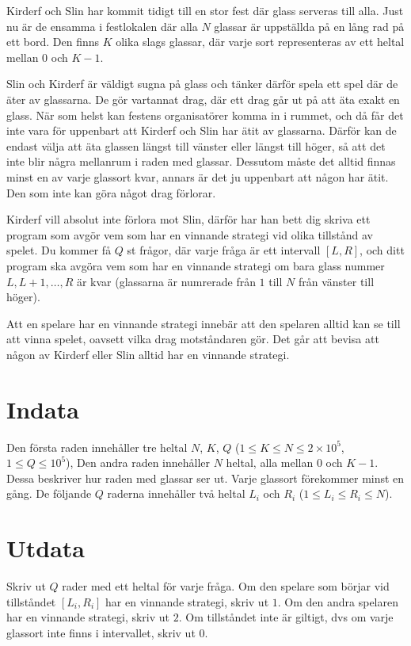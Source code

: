 Kirderf och Slin har kommit tidigt till en stor fest där glass serveras till alla.
Just nu är de ensamma i festlokalen där alla $N$ glassar är uppställda på en lång rad på ett bord.
Den finns $K$ olika slags glassar, där varje sort representeras av ett heltal mellan $0$ och $K-1$.

Slin och Kirderf är väldigt sugna på glass och tänker därför spela ett spel där de äter av glassarna.
De gör vartannat drag, där ett drag går ut på att äta exakt en glass.
När som helst kan festens organisatörer komma in i rummet, och då får det inte vara för
uppenbart att Kirderf och Slin har ätit av glassarna. Därför kan de endast välja att
äta glassen längst till vänster eller längst till höger, så att det inte blir några mellanrum
i raden med glassar. Dessutom måste det alltid finnas minst en av varje glassort kvar,
annars är det ju uppenbart att någon har ätit. Den som inte kan göra något drag förlorar.

Kirderf vill absolut inte förlora mot Slin, därför har han bett dig skriva ett program som avgör vem som har en vinnande
strategi vid olika tillstånd av spelet. Du kommer få $Q$ st frågor, där varje fråga är ett intervall $[L,R]$, och 
ditt program ska avgöra vem som har en vinnande strategi om bara glass nummer $L, L+1, \dots, R$ är kvar (glassarna
är numrerade från $1$ till $N$ från vänster till höger).

Att en spelare har en vinnande strategi innebär att den spelaren alltid kan se till att vinna spelet,
oavsett vilka drag motståndaren gör. Det går att bevisa att någon av Kirderf eller Slin alltid har en vinnande strategi.

\section*{Indata}
Den första raden innehåller tre heltal $N$, $K$, $Q$ ($1 \le K \le N \le 2 \times 10^5$, $1 \le Q \le 10^5$),
Den andra raden innehåller $N$ heltal, alla mellan $0$ och $K-1$.
Dessa beskriver hur raden med glassar ser ut. Varje glassort förekommer minst en gång.
De följande $Q$ raderna innehåller två heltal $L_i$ och $R_i$ ($1 \le L_i \le R_i \le N$).


\section*{Utdata}
Skriv ut $Q$ rader med ett heltal för varje fråga. Om den spelare som börjar vid tillståndet $[L_i, R_i]$ har en 
vinnande strategi, skriv ut $1$. Om den andra spelaren har en vinnande strategi, skriv ut $2$. Om tillståndet inte 
är giltigt, dvs om varje glassort inte finns i intervallet, skriv ut $0$.

